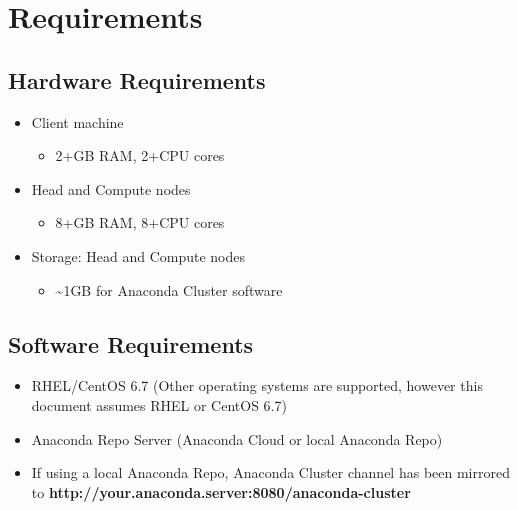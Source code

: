 \documentclass[letterpaper,10pt,openany,oneside]{sphinxmanual}
\begin{document}
\section{Requirements}
\label{AnacondaCluster:requirements}

\subsection{Hardware Requirements}
\label{AnacondaCluster:hardware-requirements}\begin{itemize}
\item {} 
Client machine
\begin{itemize}
\item {} 
2+GB RAM, 2+CPU cores

\end{itemize}

\item {} 
Head and Compute nodes
\begin{itemize}
\item {} 
8+GB RAM, 8+CPU cores

\end{itemize}

\item {} 
Storage: Head and Compute nodes
\begin{itemize}
\item {} 
\textasciitilde{}1GB for Anaconda Cluster software

\end{itemize}

\end{itemize}


\subsection{Software Requirements}
\label{AnacondaCluster:software-requirements}\begin{itemize}
\item {} 
RHEL/CentOS 6.7 (Other operating systems are supported, however this
document assumes RHEL or CentOS 6.7)

\item {} 
Anaconda Repo Server (Anaconda Cloud or local Anaconda Repo)

\item {} 
If using a local Anaconda Repo, Anaconda Cluster channel has been
mirrored to \textbf{http://your.anaconda.server:8080/anaconda-cluster}

\end{itemize}
\end{document}
